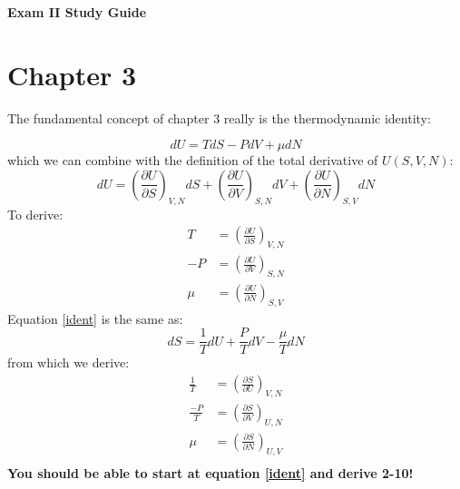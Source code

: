 \documentclass{article}
\begin{document}
\fancyfoot[C]{\thepage}
\vspace*{0cm}
\begin{center}
	{\LARGE \textbf{Exam II Study Guide}}\\
	\vspace{0.25cm}
\end{center}
\section*{Chapter 3}
The fundamental concept of chapter 3 really is the thermodynamic identity:

\begin{equation}
	\label{ident}
	dU = TdS - PdV +\mu dN
\end{equation}
which we can combine with the definition of the total derivative of $U(S,V,N)$:
\begin{equation}
	dU = \left(\frac{\partial U}{\partial S}\right)_{V,N}dS+\left(\frac{\partial U}{\partial V}\right)_{S,N}dV+\left(\frac{\partial U}{\partial N}\right)_{S,V}dN
\end{equation}
To derive:
\begin{align}
	T&= \left(\frac{\partial U}{\partial S}\right)_{V,N}\\
	-P&=\left(\frac{\partial U}{\partial V}\right)_{S,N}\\
	\mu&=\left(\frac{\partial U}{\partial N}\right)_{S,V}
\end{align}
Equation \ref{ident} is the same as:
\begin{equation}
	dS = \frac{1}{T}dU+\frac{P}{T}dV-\frac{\mu}{T}dN
\end{equation}
from which we derive:
\begin{align}
	\frac{1}{T}&=\left(\frac{\partial S}{\partial U}\right)_{V,N}\\ \label{temp}
	\frac{-P}{T}&=\left(\frac{\partial S}{\partial V}\right)_{U,N}\\
	\mu&=\left(\frac{\partial S}{\partial N}\right)_{U,V}\\
\end{align}
\textbf{You should be able to start at equation \ref{ident} and derive 2-10!}
\end{document}
